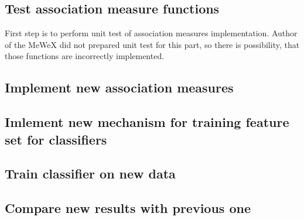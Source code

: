 \subsection{Test association measure functions}
First step is to perform unit test of association measures implementation. Author of the MeWeX did not prepared unit test for this part, so there is possibility, that those functions are incorrectly implemented.

\subsection{Implement new association measures}

\subsection{Imlement new mechanism for training feature set for classifiers}

\subsection{Train classifier on new data}

\subsection{Compare new results with previous one}
